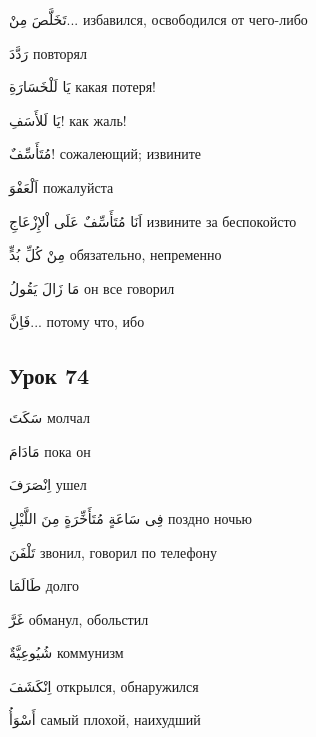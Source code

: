 \documentclass[a5paper]{article}
\newcommand\textstyleDropCaps[1]{#1}
\newcommand\textstyleCaptioncharacters[1]{#1}
\begin{document}
\textstyleCaptioncharacters{تَخَلَّصَ مِنْ...ِ }\textstyleDropCaps{избавил­ся, освободился от чего-либо‎}

\textstyleCaptioncharacters{رَدَّدَ }\textstyleDropCaps{повторял‎}

\textstyleCaptioncharacters{يَا لَلْخَسَارَةِ }\textstyleDropCaps{какая поте­ря!‎}

\textstyleCaptioncharacters{يَا لَلأَسَفِ! }\textstyleDropCaps{как жаль!‎}

\textstyleCaptioncharacters{مُتَأَسِّفٌ! }\textstyleDropCaps{сожалеющий; из­вините‎}

\textstyleCaptioncharacters{اَلْعَفْوَ }\textstyleDropCaps{пожалуйста‎}

\textstyleCaptioncharacters{اَنَا مُتَأَسِّفٌ عَلَى اْلإِزْعَاجِ }\textstyleDropCaps{извините за беспокойсто‎}

\textstyleCaptioncharacters{مِنْ كُلِّ بُدٍّ }\textstyleDropCaps{обязательно, непременно‎}

\textstyleCaptioncharacters{مَا زَالَ يَقُولُ }\textstyleDropCaps{он все го­ворил‎}

\textstyleCaptioncharacters{فَاِنَّ...ِ }\textstyleDropCaps{потому что, ибо‎}

\subsection[Урок 74‎]{\textstyleDropCaps{Урок 74‎}}
\textstyleCaptioncharacters{سَكَتَ }\textstyleDropCaps{молчал‎}

\textstyleCaptioncharacters{مَادَامَ }\textstyleDropCaps{пока он‎}

\textstyleCaptioncharacters{اِنْصَرَفَ }\textstyleDropCaps{ушел‎}

\textstyleCaptioncharacters{فِى سَاعَةٍ مُتَأَخِّرَةٍ مِنَ اللَّيْلِ }\textstyleDropCaps{поздно ночью‎}

\textstyleCaptioncharacters{تَلْفَنَ }\textstyleDropCaps{звонил, говорил по телефону‎}

\textstyleCaptioncharacters{طَالَمَا }\textstyleDropCaps{долго‎}

\textstyleCaptioncharacters{غَرَّ }\textstyleDropCaps{обманул, обольстил‎}

\textstyleCaptioncharacters{شُيُوعِيَّةٌ }\textstyleDropCaps{коммунизм‎}

\textstyleCaptioncharacters{اِنْكَشَفَ }\textstyleDropCaps{открылся, обна­ружился‎}

\textstyleCaptioncharacters{أَسْوَأُ }\textstyleDropCaps{самый плохой, наи­худший‎}
\end{document}

